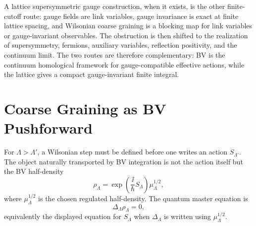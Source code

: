 A lattice supersymmetric gauge construction, when it exists, is the other
finite-cutoff route: gauge fields are link variables, gauge invariance is
exact at finite lattice spacing, and Wilsonian coarse graining is a blocking
map for link variables or gauge-invariant observables.  The obstruction is
then shifted to the realization of supersymmetry, fermions, auxiliary
variables, reflection positivity, and the continuum limit.  The two routes are
therefore complementary: BV is the continuum homological framework for
gauge-compatible effective actions, while the lattice gives a compact
gauge-invariant finite integral.

\section{Coarse Graining as BV Pushforward}

For \(\Lambda>\Lambda'\), a Wilsonian step must be defined before one writes
an action \(S_{\Lambda'}\).  The object naturally transported by BV
integration is not the action itself but the BV half-density
\[
  \rho_\Lambda
  =
  \exp\!\left(\frac{\ii}{\hbar}S_\Lambda\right)\mu_\Lambda^{1/2},
\]
where \(\mu_\Lambda^{1/2}\) is the chosen regulated half-density.  The
quantum master equation is
\[
  \Delta_\Lambda\rho_\Lambda=0,
\]
equivalently the displayed equation for \(S_\Lambda\) when
\(\Delta_\Lambda\) is written using \(\mu_\Lambda^{1/2}\).

